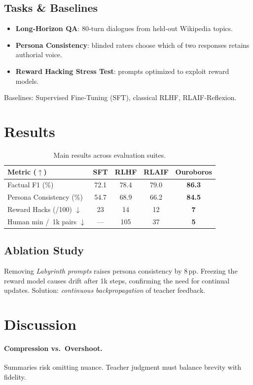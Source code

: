 \documentclass[11pt]{article}
\begin{document}
\subsection{Tasks \& Baselines}
\begin{itemize}
    \item \textbf{Long‑Horizon QA}: 80‑turn dialogues from held‑out Wikipedia topics.
    \item \textbf{Persona Consistency}: blinded raters choose which of two responses retains authorial voice.
    \item \textbf{Reward Hacking Stress Test}: prompts optimized to exploit reward models.
\end{itemize}
Baselines: Supervised Fine‑Tuning (SFT), classical RLHF, RLAIF‑Reflexion.

\section{Results}
\begin{table}[h]
\centering
\begin{tabular}{lcccc}
\toprule
\textbf{Metric} ($\uparrow$) & \textbf{SFT} & \textbf{RLHF} & \textbf{RLAIF} & \textbf{Ouroboros}\\
\midrule
Factual F1 (\%)    & 72.1 & 78.4 & 79.0 & \textbf{86.3}\\
Persona Consistency (\%) & 54.7 & 68.9 & 66.2 & \textbf{84.5}\\
Reward Hacks (/100) $\downarrow$ & 23 & 14 & 12 & \textbf{7}\\
Human min / 1k pairs $\downarrow$ & --- & 105 & 37 & \textbf{5}\\
\bottomrule
\end{tabular}
\caption{Main results across evaluation suites.}
\label{tab:results}
\end{table}

\subsection{Ablation Study}
Removing \emph{Labyrinth prompts} raises persona consistency by 8 pp. Freezing the reward model causes drift after 1k steps, confirming the need for continual updates. Solution: \emph{continuous backpropagation} of teacher feedback.

\section{Discussion}
\paragraph{Compression vs.\ Overshoot.} Summaries risk omitting nuance.  Teacher judgment must balance brevity with fidelity.%
\end{document}
